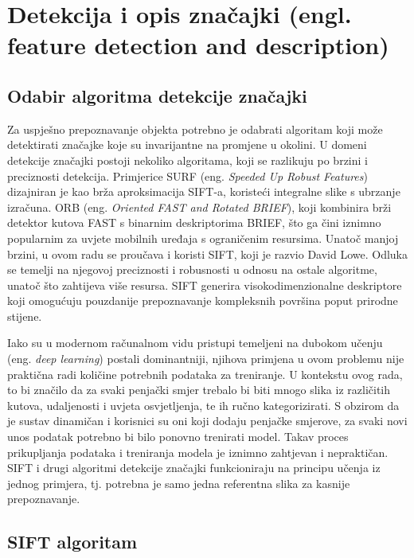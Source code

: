 \section{Detekcija i opis značajki (engl. feature detection and description)}

\subsection{Odabir algoritma detekcije značajki}

Za uspješno prepoznavanje objekta potrebno je odabrati algoritam koji može detektirati značajke koje su invarijantne na promjene u okolini. U domeni detekcije značajki postoji nekoliko algoritama, koji se razlikuju po brzini i preciznosti detekcija. Primjerice SURF (eng. \textit{Speeded Up Robust Features}) dizajniran je kao brža aproksimacija SIFT-a, koristeći integralne slike s ubrzanje izračuna. ORB (eng. \textit{Oriented FAST and Rotated BRIEF}), koji kombinira brži detektor kutova FAST s binarnim deskriptorima BRIEF, što ga čini iznimno popularnim za uvjete mobilnih uređaja s ograničenim resursima. Unatoč manjoj brzini, u ovom radu se proučava i koristi SIFT, koji je razvio David Lowe. Odluka se temelji na njegovoj preciznosti i robusnosti u odnosu na ostale algoritme, unatoč što zahtijeva više resursa. SIFT generira visokodimenzionalne deskriptore koji omogućuju pouzdanije prepoznavanje kompleksnih površina poput prirodne stijene. 

Iako su u modernom računalnom vidu pristupi temeljeni na dubokom učenju (eng. \textit{deep learning}) postali dominantniji, njihova primjena u ovom problemu nije praktična radi količine potrebnih podataka za treniranje. U kontekstu ovog rada, to bi značilo da za svaki penjački smjer trebalo bi biti mnogo slika iz različitih kutova, udaljenosti i uvjeta osvjetljenja, te ih ručno kategorizirati. S obzirom da je sustav dinamičan i korisnici su oni koji dodaju penjačke smjerove, za svaki novi unos podatak potrebno bi bilo ponovno trenirati model. Takav proces prikupljanja podataka i treniranja modela je iznimno zahtjevan i nepraktičan. SIFT i drugi algoritmi detekcije značajki funkcioniraju na principu učenja iz jednog primjera, tj. potrebna je samo jedna referentna slika za kasnije prepoznavanje. 

\subsection{SIFT algoritam}

